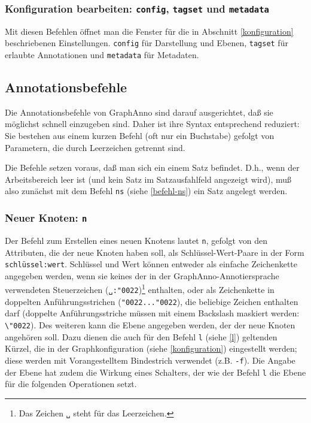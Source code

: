\documentclass[12pt]{scrartcl}
\newcommand{\quo}{\char"0022}
\begin{document}
\subsubsection{Konfiguration bearbeiten: \texttt{config}, \texttt{tagset} und \texttt{metadata}}

Mit diesen Befehlen öffnet man die Fenster für die in Abschnitt \ref{konfiguration} beschriebenen Einstellungen. \texttt{config} für Darstellung und Ebenen, \texttt{tagset} für erlaubte Annotationen und \texttt{metadata} für Metadaten.


\subsection{Annotationsbefehle}\label{annotationsbefehle}

Die Annotationsbefehle von GraphAnno sind darauf ausgerichtet, daß sie möglichst schnell einzugeben sind. Daher ist ihre Syntax entsprechend reduziert: Sie bestehen aus einem kurzen Befehl (oft nur ein Buchstabe) gefolgt von Parametern, die durch Leerzeichen getrennt sind.

Die Befehle setzen voraus, daß man sich ein einem Satz befindet. D.h., wenn der Arbeitsbereich leer ist (und kein Satz im Satzausfahlfeld angezeigt wird), muß also zunächst mit dem Befehl \texttt{ns} (siehe \ref{befehl-ns}) ein Satz angelegt werden.


\subsubsection{Neuer Knoten: \texttt{n}}\label{befehl-n}

Der Befehl zum Erstellen eines neuen Knotens lautet \texttt{n}, gefolgt von den Attributen, die der neue Knoten haben soll, als Schlüssel-Wert-Paare in der Form \texttt{schlüssel:wert}. Schlüssel und Wert können entweder als einfache Zeichenkette angegeben werden, wenn sie keines der in der GraphAnno-Annotiersprache verwendeten Steuerzeichen (\texttt{␣:\quo})\footnote{Das Zeichen \texttt{␣} steht für das Leerzeichen.} enthalten, oder als Zeichenkette in doppelten Anführungsstrichen (\texttt{\quo...\quo}), die beliebige Zeichen enthalten darf (doppelte Anführungsstriche müssen mit einem Backslash maskiert werden: \texttt{\textbackslash\quo}).
Des weiteren kann die Ebene angegeben werden, der der neue Knoten angehören soll. Dazu dienen die auch für den Befehl \texttt{l} (siehe \ref{l}) geltenden Kürzel, die in der Graphkonfiguration (siehe \ref{konfiguration}) eingestellt werden; diese werden mit Vorangestelltem Bindestrich verwendet (z.B. \texttt{-f}). Die Angabe der Ebene hat zudem die Wirkung eines Schalters, der wie der Befehl \texttt{l} die Ebene für die folgenden Operationen setzt.
\end{document}
